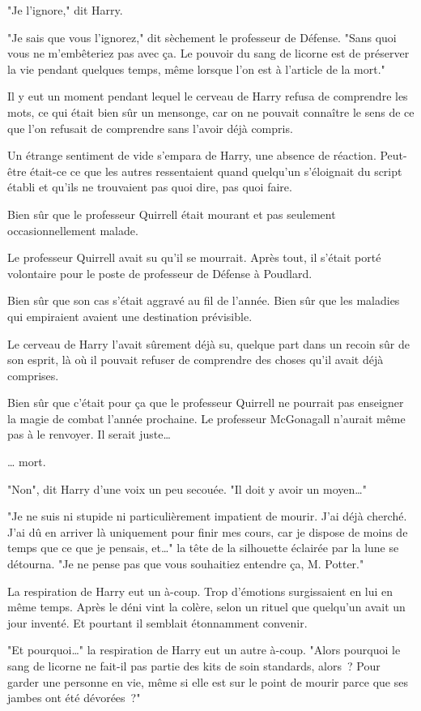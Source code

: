 "Je l'ignore," dit Harry.

"Je sais que vous l'ignorez," dit sèchement le professeur de Défense. "Sans quoi vous ne m'embêteriez pas avec ça. Le pouvoir du sang de licorne est de préserver la vie pendant quelques temps, même lorsque l'on est à l'article de la mort."

Il y eut un moment pendant lequel le cerveau de Harry refusa de comprendre les mots, ce qui était bien sûr un mensonge, car on ne pouvait connaître le sens de ce que l'on refusait de comprendre sans l'avoir déjà compris.

Un étrange sentiment de vide s'empara de Harry, une absence de réaction. Peut-être était-ce ce que les autres ressentaient quand quelqu'un s'éloignait du script établi et qu'ils ne trouvaient pas quoi dire, pas quoi faire.

Bien sûr que le professeur Quirrell était mourant et pas seulement occasionnellement malade.

Le professeur Quirrell avait su qu'il se mourrait. Après tout, il s'était porté volontaire pour le poste de professeur de Défense à Poudlard.

Bien sûr que son cas s'était aggravé au fil de l'année. Bien sûr que les maladies qui empiraient avaient une destination prévisible.

Le cerveau de Harry l'avait sûrement déjà su, quelque part dans un recoin sûr de son esprit, là où il pouvait refuser de comprendre des choses qu'il avait déjà comprises.

Bien sûr que c'était pour ça que le professeur Quirrell ne pourrait pas enseigner la magie de combat l'année prochaine. Le professeur McGonagall n'aurait même pas à le renvoyer. Il serait juste…

… mort.

"Non", dit Harry d'une voix un peu secouée. "Il doit y avoir un moyen…"

"Je ne suis ni stupide ni particulièrement impatient de mourir. J'ai déjà cherché. J'ai dû en arriver là uniquement pour finir mes cours, car je dispose de moins de temps que ce que je pensais, et…" la tête de la silhouette éclairée par la lune se détourna. "Je ne pense pas que vous souhaitiez entendre ça, M. Potter."

La respiration de Harry eut un à-coup. Trop d'émotions surgissaient en lui en même temps. Après le déni vint la colère, selon un rituel que quelqu'un avait un jour inventé. Et pourtant il semblait étonnamment convenir.

"Et pourquoi…" la respiration de Harry eut un autre à-coup. "Alors pourquoi le sang de licorne ne fait-il pas partie des kits de soin standards, alors~? Pour garder une personne en vie, même si elle est sur le point de mourir parce que ses jambes ont été dévorées~?"

